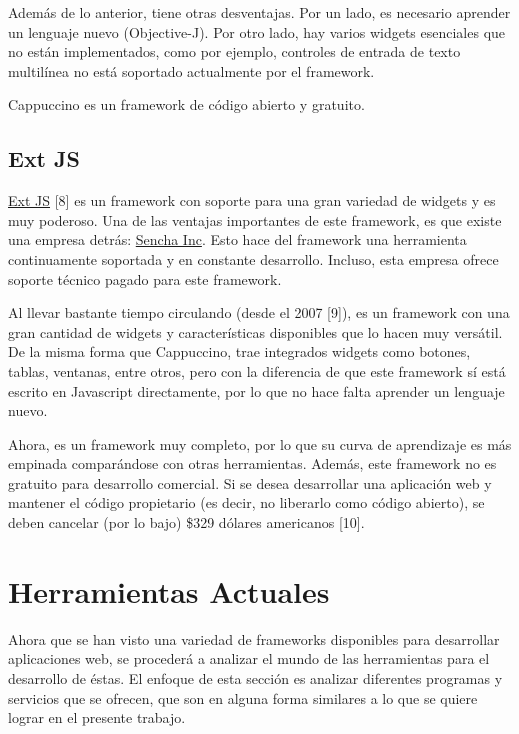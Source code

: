 \documentclass[12pt,spanish,letter]{report}
\begin{document}
Además de lo anterior, tiene otras desventajas. Por un lado, es
necesario aprender un lenguaje nuevo (Objective-J). Por otro lado, hay
varios widgets esenciales que no están implementados, como por ejemplo,
controles de entrada de texto multilínea no está soportado actualmente
por el framework.

Cappuccino es un framework de código abierto y gratuito.

\subsection{Ext JS}

\href{http://www.sencha.com/products/extjs/}{Ext JS} {[}8{]} es un
framework con soporte para una gran variedad de widgets y es muy
poderoso. Una de las ventajas importantes de este framework, es que
existe una empresa detrás: \href{http://www.sencha.com/}{Sencha Inc}.
Esto hace del framework una herramienta continuamente soportada y en
constante desarrollo. Incluso, esta empresa ofrece soporte técnico
pagado para este framework.

Al llevar bastante tiempo circulando (desde el 2007 {[}9{]}), es un
framework con una gran cantidad de widgets y características disponibles
que lo hacen muy versátil. De la misma forma que Cappuccino, trae
integrados widgets como botones, tablas, ventanas, entre otros, pero con
la diferencia de que este framework sí está escrito en Javascript
directamente, por lo que no hace falta aprender un lenguaje nuevo.

Ahora, es un framework muy completo, por lo que su curva de aprendizaje
es más empinada comparándose con otras herramientas. Además, este
framework no es gratuito para desarrollo comercial. Si se desea
desarrollar una aplicación web y mantener el código propietario (es
decir, no liberarlo como código abierto), se deben cancelar (por lo
bajo) \$329 dólares americanos {[}10{]}.

\section{Herramientas Actuales}

Ahora que se han visto una variedad de frameworks disponibles para
desarrollar aplicaciones web, se procederá a analizar el mundo de las
herramientas para el desarrollo de éstas. El enfoque de esta sección es
analizar diferentes programas y servicios que se ofrecen, que son en
alguna forma similares a lo que se quiere lograr en el presente trabajo.
\end{document}
